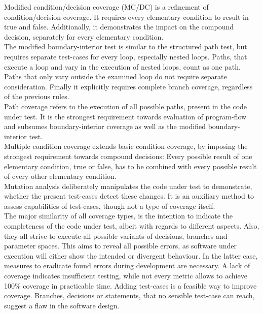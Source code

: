 	Modified condition/decision coverage (MC/DC) is a refinement of condition/decision coverage. It requires every elementary condition to result in true and false. Additionally, it  demonstrates the impact on the compound decision, separately for every elementary condition. 	\\

	The modified boundary-interior test is similar to the structured path test, but requires separate test-cases for every loop, especially nested loops. Paths, that execute a loop and vary in the execution of nested loops, count as one path. Paths that only vary outside the examined loop do not require separate consideration. Finally it explicitly requires complete branch coverage, regardless of the previous rules. \\

	Path coverage refers to the execution of all possible paths, present in the code under test. It is the strongest requirement towards evaluation of program-flow and subsumes boundary-interior coverage as well as the modified boundary-interior test.  \\


	Multiple condition coverage extends basic condition coverage, by imposing the strongest requirement towards compound decisions: Every possible result of one elementary condition, true or false, has to be combined with every possible result of every other elementary condition. \\


	Mutation analysis deliberately manipulates the code under test to demonstrate, whether the present test-cases detect these changes. It is an auxiliary method to assess capabilities of test-cases, though not a type of coverage itself. \\

	The major similarity of all coverage types, is the intention to indicate the completeness of the code under test, albeit with regards to different aspects. Also, they all strive to execute all possible variants of decisions, branches and parameter spaces. This aims to reveal all possible errors, as software under execution will either show the intended or divergent behaviour. In the latter case, measures to eradicate found errors during development are necessary. A lack of coverage indicates insufficient testing, while not every metric allows to achieve 100\% coverage in practicable time. Adding test-cases is a feasible way to improve coverage. Branches, decisions or statements, that no sensible test-case can reach, suggest a flaw in the software design. \\

